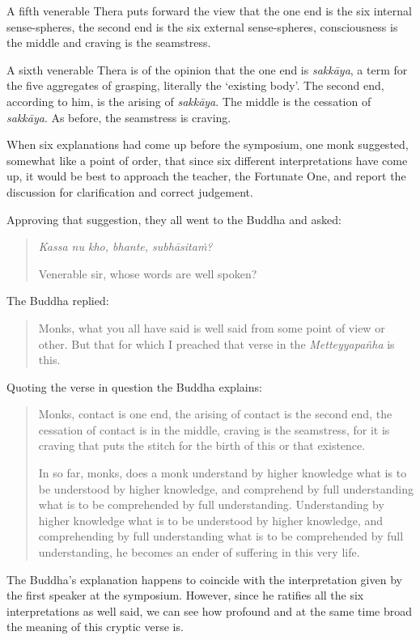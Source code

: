 A fifth venerable Thera puts forward the view that the one end is the six internal sense-spheres, the second end is the six external sense-spheres, consciousness is the middle and craving is the seamstress.

A sixth venerable Thera is of the opinion that the one end is \emph{sakkāya}, a term for the five aggregates of grasping, literally the `existing body'. The second end, according to him, is the arising of \emph{sakkāya}. The middle is the cessation of \emph{sakkāya}. As before, the seamstress is craving.

When six explanations had come up before the symposium, one monk suggested, somewhat like a point of order, that since six different interpretations have come up, it would be best to approach the teacher, the Fortunate One, and report the discussion for clarification and correct judgement.

Approving that suggestion, they all went to the Buddha and asked:

\begin{quote}
\emph{Kassa nu kho, bhante, subhāsitaṁ?}

Venerable sir, whose words are well spoken?
\end{quote}

The Buddha replied:

\begin{quote}
Monks, what you all have said is well said from some point of view or other. But that for which I preached that verse in the \emph{Metteyyapañha} is this.
\end{quote}

Quoting the verse in question the Buddha explains:

\begin{quote}
Monks, contact is one end, the arising of contact is the second end, the cessation of contact is in the middle, craving is the seamstress, for it is craving that puts the stitch for the birth of this or that existence.

In so far, monks, does a monk understand by higher knowledge what is to be understood by higher knowledge, and comprehend by full understanding what is to be comprehended by full understanding. Understanding by higher knowledge what is to be understood by higher knowledge, and comprehending by full understanding what is to be comprehended by full understanding, he becomes an ender of suffering in this very life.
\end{quote}

The Buddha's explanation happens to coincide with the interpretation given by the first speaker at the symposium. However, since he ratifies all the six interpretations as well said, we can see how profound and at the same time broad the meaning of this cryptic verse is.


